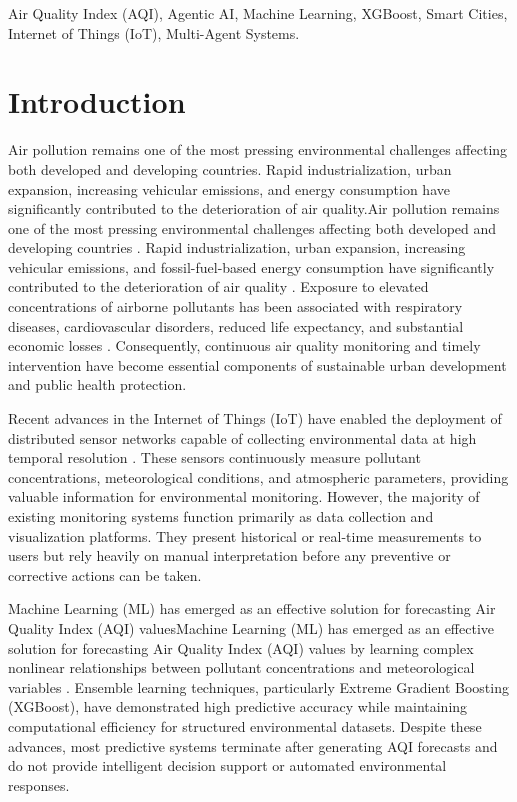 \documentclass[conference]{IEEEtran}
\begin{document}
\begin{IEEEkeywords}
Air Quality Index (AQI), Agentic AI, Machine Learning, XGBoost, Smart Cities, Internet of Things (IoT), Multi-Agent Systems.
\end{IEEEkeywords}

\section{Introduction}

Air pollution remains one of the most pressing environmental challenges affecting both developed and developing countries. Rapid industrialization, urban expansion, increasing vehicular emissions, and energy consumption have significantly contributed to the deterioration of air quality.Air pollution remains one of the most pressing environmental challenges affecting both developed and developing countries \cite{b8,b9}. Rapid industrialization, urban expansion, increasing vehicular emissions, and fossil-fuel-based energy consumption have significantly contributed to the deterioration of air quality \cite{b10,b11}. Exposure to elevated concentrations of airborne pollutants has been associated with respiratory diseases, cardiovascular disorders, reduced life expectancy, and substantial economic losses \cite{b12,b13}. Consequently, continuous air quality monitoring and timely intervention have become essential components of sustainable urban development and public health protection.

Recent advances in the Internet of Things (IoT) have enabled the deployment of distributed sensor networks capable of collecting environmental data at high temporal resolution \cite{b14,b15}. These sensors continuously measure pollutant concentrations, meteorological conditions, and atmospheric parameters, providing valuable information for environmental monitoring. However, the majority of existing monitoring systems function primarily as data collection and visualization platforms. They present historical or real-time measurements to users but rely heavily on manual interpretation before any preventive or corrective actions can be taken.

Machine Learning (ML) has emerged as an effective solution for forecasting Air Quality Index (AQI) valuesMachine Learning (ML) has emerged as an effective solution for forecasting Air Quality Index (AQI) values by learning complex nonlinear relationships between pollutant concentrations and meteorological variables \cite{b1,b2,b5,b6}. Ensemble learning techniques, particularly Extreme Gradient Boosting (XGBoost), have demonstrated high predictive accuracy while maintaining computational efficiency for structured environmental datasets. Despite these advances, most predictive systems terminate after generating AQI forecasts and do not provide intelligent decision support or automated environmental responses.
\end{document}
